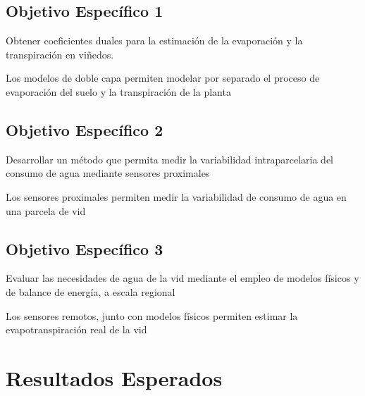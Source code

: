 \documentclass[]{article}
\begin{document}
\subsection{Objetivo Específico 1}
Obtener coeficientes duales para la estimación de la evaporación y la transpiración en viñedos.



Los modelos de doble capa permiten modelar por separado el proceso de evaporación del suelo y la transpiración de la planta

\subsection{Objetivo Específico 2}
Desarrollar un método que permita medir la variabilidad intraparcelaria del consumo de agua mediante sensores proximales

Los sensores proximales permiten medir la variabilidad de consumo de agua en una parcela de vid

\subsection{Objetivo Específico 3}
Evaluar las necesidades de agua de la vid mediante el empleo de modelos físicos y de balance de energía, a escala regional

Los sensores remotos, junto con modelos físicos permiten estimar la evapotranspiración real de la vid

\section{Resultados Esperados}






\clearpage


\end{document}
